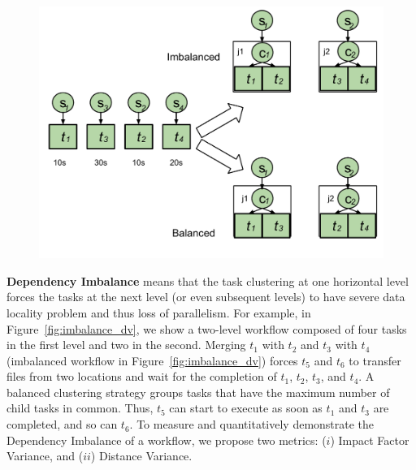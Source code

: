 \begin{figure}[htb]
	\centering
	\includegraphics[width=1.0\linewidth]{figures/imbalance/runtime_variance.pdf}
	\label{fig:imbalance_rv}
\end{figure}


\textbf{Dependency Imbalance} means that the task clustering at one horizontal level forces the tasks at the next level (or even subsequent levels) to have severe data locality problem and thus loss of parallelism. For example, in Figure~\ref{fig:imbalance_dv}, we show a two-level workflow composed of four tasks in the first level and two in the second. Merging $t_1$ with $t_2$ and $t_3$ with $t_4$ (imbalanced workflow in Figure~\ref{fig:imbalance_dv}) forces $t_5$ and $t_6$ to transfer files from two locations and wait for the completion of $t_1$, $t_2$, $t_3$, and $t_4$.  A balanced clustering strategy groups tasks that have the maximum number of child tasks in common. Thus, $t_5$ can start to execute as soon as $t_1$ and $t_3$ are completed, and so can $t_6$. To measure and quantitatively demonstrate the Dependency Imbalance of a workflow, we propose two  metrics: ($i$) Impact Factor Variance, and ($ii$) Distance Variance. 

